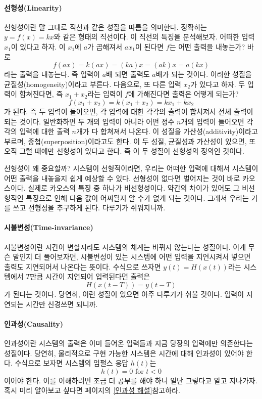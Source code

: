 \paragraph{선형성(Linearity)}
선형성이란 말 그대로 직선과 같은 성질을 따름을 의미한다. 정확히는 $y=f(x)=kx$와 같은 형태의 직선이다. 이 직선의 특징을 분석해보자.
어떠한 입력 $x_1$이 있다고 하자. 이 $x_1$에 $a$가 곱해져서 $ax_1$이 된다면 $f$는 어떤 출력을 내놓는가? 바로 
\begin{equation*}
    f(ax)=k(ax)=(ka)x=(ak)x=a(kx)
\end{equation*}
라는 출력을 내놓는다.
즉 입력이 $a$배 되면 출력도 $a$배가 되는 것이다. 이러한 성질을 균질성(homogeneity)이라고 부른다.
다음으로, 또 다른 입력 $x_2$가 있다고 하자. 두 입력이 합쳐진다면, 즉 $x_1+x_2$라는 입력이 $f$에 가해진다면 출력은 어떻게 되는가?
\begin{equation*}
    f(x_1+x_2)=k(x_1+x_2)=kx_1+kx_2
\end{equation*}
가 된다. 즉 두 입력이 들어오면, 각 입력에 대한 각각의 출력이 합쳐져서 전체 출력이 되는 것이다.
일반화하면 두 개의 입력이 아니라 어떤 정수 $n$개의 입력이 들어오면 각각의 입력에 대한 출력 $n$개가 다 합쳐져서 나온다.
이 성질을 가산성(additivity)이라고 부르며, 중첩(superposition)이라고도 한다. 
이 두 성질, 균질성과 가산성이 있으면, 또 오직 그럴 때에만 선형성이 있다고 한다. 즉 이 두 성질이 선형성의 정의인 것이다.
\par
선형성이 왜 중요할까? 시스템이 선형적이라면, 우리는 어떠한 입력에 대해서 시스템이 어떤 출력을 내놓을지 쉽게 예상할 수 있다.
선형성이 없다면 벌어지는 것이 바로 카오스이다. 실제로 카오스의 특징 중 하나가 비선형성이다. 
약간의 차이가 있어도 그 비선형적인 특징으로 인해 다음 값이 어찌될지 알 수가 없게 되는 것이다. 그래서 우리는 기를 쓰고 선형성을 추구하게 된다. 다루기가 쉬워지니까.
\paragraph{시불변성(Time-invariance)}
시불변성이란 시간이 변할지라도 시스템의 체계는 바뀌지 않는다는 성질이다.
이게 무슨 말인지 더 풀어보자면, 시불변성이 있는 시스템에 어떤 입력을 지연시켜서 넣으면 출력도 지연되어서 나온다는 뜻이다.
수식으로 쓰자면 $y(t)=H(x(t))$라는 시스템에서 $T$만큼 시간이 지연되어 입력된다면 출력은 
\begin{equation*}
    H(x(t-T))=y(t-T)
\end{equation*}
가 된다는 것이다.
당연히, 이런 성질이 있으면 아주 다루기가 쉬울 것이다. 입력이 지연되는 시간만 신경쓰면 되니까.
\paragraph{인과성(Causality)}\label{causality}
인과성이란 시스템의 출력은 이미 들어온 입력들과 지금 당장의 입력에만 의존한다는 성질이다.
당연히, 물리적으로 구현 가능한 시스템은 시간에 대해 인과성이 있어야 한다.
수식으로 보자면 시스템의 임펄스 응답 $h(t)$는 
\begin{equation}
    h(t)=0\text{ for }t<0 \label{eqn:causality condition}
\end{equation}
이어야 한다. 이를 이해하려면 조금 더 공부를 해야 하니 일단 그렇다고 알고 지나가자. 혹시 미리 알아보고 싶다면 \pageref{인과성 해설} 페이지의 \ref{인과성 해설}\을 참고하라.
